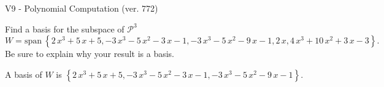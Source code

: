 \begin{exercise}
  \begin{exerciseTitle}V9 - Polynomial Computation (ver. 772)\end{exerciseTitle}
  \begin{exerciseStatement}
    Find a basis for the subspace of \(\mathcal{P}^3\) 
\[W=\mathrm{span}\ \left\{2 \, x^{3} + 5 \, x + 5 , -3 \, x^{3} - 5 \, x^{2} - 3 \, x - 1 , -3 \, x^{3} - 5 \, x^{2} - 9 \, x - 1 , 2 \, x , 4 \, x^{3} + 10 \, x^{2} + 3 \, x - 3\right\}.\]
 Be sure to explain why your result is a basis.


  \end{exerciseStatement}
  \begin{exerciseAnswer}
   A basis of \(W\) is  \(\left\{2 \, x^{3} + 5 \, x + 5 , -3 \, x^{3} - 5 \, x^{2} - 3 \, x - 1 , -3 \, x^{3} - 5 \, x^{2} - 9 \, x - 1\right\}\).
  


  \end{exerciseAnswer}
\end{exercise}
